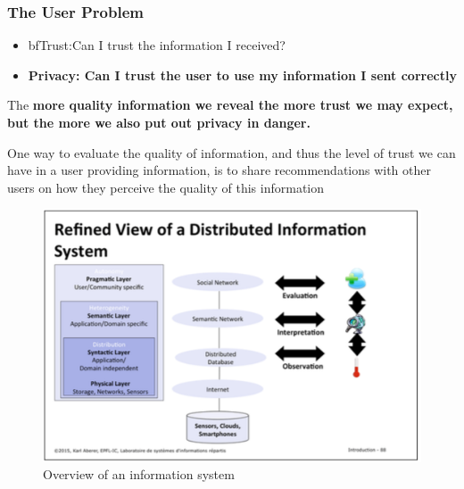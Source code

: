 \subsubsection{The User Problem}
\begin{itemize}
\item bf{Trust:}Can I trust the information I received?
\item \bf{Privacy:} Can I trust the user to use my information I sent correctly
\end{itemize}
The \bf{more quality information} we reveal the \bf{more trust} we may expect, but the \bf{more} we also put out \bf{privacy} in danger.

One way to evaluate the quality of information, and thus the level of trust we can have in a user providing information, is to share recommendations with other users on how they perceive the quality of this information

\begin{figure}[!h]
\begin{center}
\includegraphics[width=1\linewidth]{figures/viewIS2.png}
\end{center}
\caption{Overview of an information system}
\end{figure}


